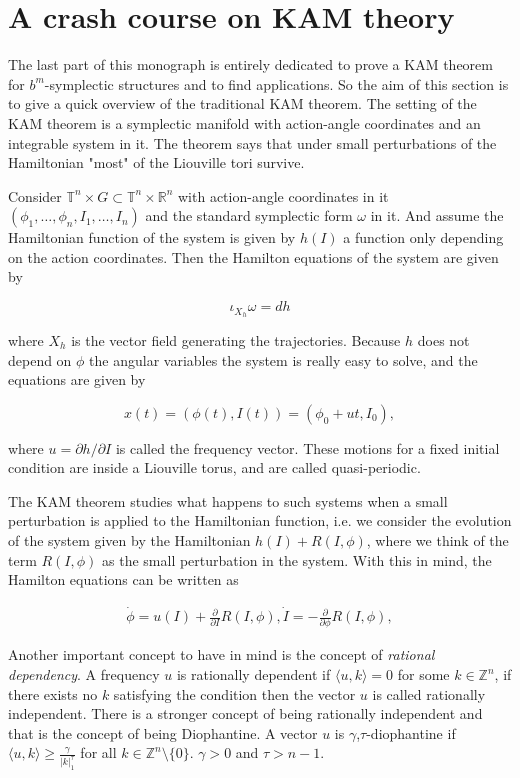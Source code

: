 \chapter{A crash course on KAM theory}

The last part of this monograph is entirely dedicated to prove a KAM theorem for $b^m$-symplectic structures and to find applications. So the aim of this section is to give a quick overview of the traditional KAM theorem. The setting of the KAM theorem is a symplectic manifold with action-angle coordinates and an integrable system in it. The theorem says that under small perturbations of the Hamiltonian "most" of the Liouville tori survive.

Consider $\mathbb{T}^n\times G \subset \mathbb{T}^n \times \mathbb{R}^n$ with action-angle coordinates in it $(\phi_1,\ldots,\phi_n,I_1,\ldots,I_n)$ and the standard symplectic form $\omega$ in it. And assume the Hamiltonian function of the system is given by $h(I)$ a function only depending on the action coordinates. Then the Hamilton equations of the system are given by

$$\iota_{X_h} \omega = dh$$

where $X_h$ is the vector field generating the trajectories. Because $h$ does not depend on $\phi$ the angular variables the system is really easy to solve, and the equations are given by

$$x(t) = (\phi(t), I(t)) = (\phi_0 + ut, I_0),$$

where $u = \partial h/\partial I$ is called the frequency vector. These motions for a fixed initial condition are inside a Liouville torus, and are called quasi-periodic.

The KAM theorem studies what happens to such systems when a small perturbation is applied to the Hamiltonian function, i.e. we consider the evolution of the system given by the Hamiltonian $h(I) + R(I,\phi)$, where we think of the term $R(I,\phi)$ as the small perturbation in the system. With this in mind, the Hamilton equations can be written as

$$
\begin{array}{l}
\dot{\phi} = u(I) + \frac{\partial}{\partial I}R(I,\phi),
\dot{I} = -\frac{\partial}{\partial \phi}R(I,\phi),
\end{array}
$$


Another important concept to have in mind is the concept of \emph{rational dependency}. A frequency $u$ is rationally dependent if $\langle u , k \rangle= 0$ for some $k \in \mathbb{Z}^n$, if there exists no $k$ satisfying the condition then the vector $u$ is called rationally independent. There is a stronger concept of being rationally independent and that is the concept of being Diophantine. A vector $u$ is $\gamma$,$\tau$-diophantine if $\langle u, k\rangle \geq \frac{\gamma}{|k|_1^\tau}$ for all $k\in \mathbb{Z}^n\setminus\{0\}$. $\gamma > 0$ and $\tau > n-1$.

